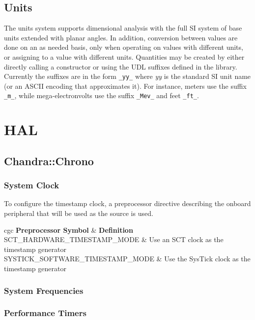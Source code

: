 \documentclass[10pt,letterpaper]{memoir} %
\begin{document}
\subsection{Units}
The units system supports dimensional analysis with the full SI system of base units extended with planar angles.  In addition, conversion between values are done on an as needed basis, only when operating on values with different units, or assigning to a value with different units.  Quantities may be created by either directly calling a constructor or using the UDL suffixes defined in the library.  Currently the suffixes are in the form \texttt{_yy_} where \emph{yy} is the standard SI unit name (or an ASCII encoding that approximates it).  For instance, meters use the suffix \texttt{_m_}, while mega-electronvolts use the suffix \texttt{_Mev_} and feet \texttt{_ft_}.

\section{HAL}
\subsection{Chandra::Chrono}
\subsubsection{System Clock}
To configure the timestamp clock, a preprocessor directive describing the onboard peripheral that will be used as the source is used. \\
	\begin{centering}
	\begin{tabular}{cgc}
		\textbf{Preprocessor Symbol}  & \textbf{Definition}\\
		SCT\_HARDWARE\_TIMESTAMP\_MODE & Use an SCT clock as the timestamp generator\\
		SYSTICK\_SOFTWARE\_TIMESTAMP\_MODE & Use the SysTick clock as the timestamp generator\\
		
	\end{tabular}
	\end{centering}

\subsubsection{System Frequencies}
\subsubsection{Performance Timers}
\end{document}
